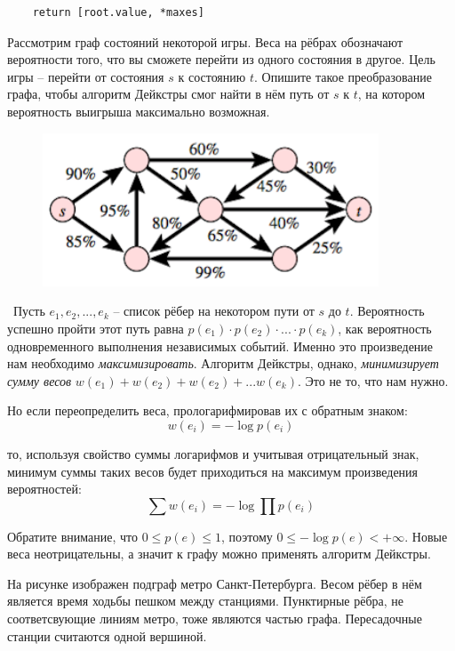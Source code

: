 \documentclass[12pt]{exam}
\begin{document}
\begin{questions}
\begin{solution}
\begin{verbatim}
    return [root.value, *maxes]
\end{verbatim}
\end{solution}


\question[10] Рассмотрим граф состояний некоторой игры. Веса на рёбрах обозначают вероятности того, что вы сможете перейти из одного состояния в другое. Цель игры -- перейти от состояния $s$ к состоянию $t$. Опишите такое преобразование графа, чтобы алгоритм Дейкстры смог найти в нём путь от $s$ к $t$, на котором вероятность выигрыша максимально возможная.

\begin{figure}[h!]
\begin{center}
  \includegraphics[width=10cm]{weighted.png}
  \end{center}
\end{figure}


\begin{solution} \
Пусть $e_1, e_2, ..., e_k$ -- список рёбер на некотором пути от $s$ до $t$. Вероятность успешно пройти этот путь равна $p(e_1) \cdot p(e_2) \cdot ... \cdot p(e_k)$, как вероятность одновременного выполнения независимых событий. Именно это произведение нам необходимо {\it максимизировать}. Алгоритм Дейкстры, однако, {\it минимизирует сумму весов} $w(e_1) + w(e_2) + w(e_2) + ... w(e_k)$. Это не то, что нам нужно.

Но если переопределить веса, прологарифмировав их с обратным знаком:
$$
w(e_i) = -\log p(e_i)
$$

то, используя свойство суммы логарифмов и учитывая отрицательный знак, минимум суммы таких весов будет приходиться на максимум произведения вероятностей:
$$
\sum w(e_i) = -\log \prod p(e_i)
$$

Обратите внимание, что $0 \leqslant p(e) \leqslant 1$, поэтому $0 \leqslant -\log p(e) < +\infty$. Новые веса неотрицательны, а значит к графу можно применять алгоритм Дейкстры.
\end{solution}




\question[3] На рисунке изображен подграф метро Санкт-Петербурга. Весом рёбер в нём является время ходьбы пешком между станциями. Пунктирные рёбра, не соответсвующие линиям метро, тоже являются частью графа. Пересадочные станции считаются одной вершиной.


\end{questions}
\end{document}
